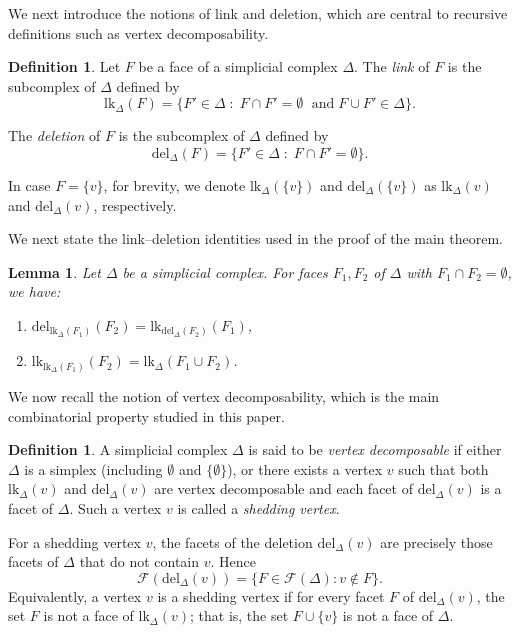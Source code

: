 \documentclass[12pt,reqno]{amsart}
\newtheorem{lemma}[theorem]{Lemma}
\theoremstyle{definition}
\newtheorem{definition}[theorem]{Definition}
\def\del{\mathrm{del}}
\def\lk{\mathrm{lk}}
\begin{document}
We next introduce the notions of link and deletion, which are central to recursive definitions such as vertex decomposability.

\begin{definition}\label{def: lk and del}
Let $F$ be a face of a simplicial complex $\Delta$. The \emph{link} of $F$ is the subcomplex of $\Delta$ defined by
\[
\lk_{\Delta}(F)=\{F' \in \Delta \; : \; F \cap F' = \emptyset \; \text{ and}\; F \cup F' \in \Delta\}.
\]

The \emph{deletion} of $F$ is the subcomplex of $\Delta$ defined by
\[
\del_{\Delta}(F)=\{F' \in \Delta \; : \; F \cap F' = \emptyset\}.
\]
\end{definition}

In case $F=\{v\}$, for brevity, we denote $\mathrm{lk}_{\Delta}(\{v\})$ and $\mathrm{del}_{\Delta}(\{v\})$ as $\mathrm{lk}_{\Delta}(v)$ and $\mathrm{del}_{\Delta}(v)$, respectively. 

We next state the link–deletion identities used in the proof of the main theorem.

\begin{lemma}\cite[Lemma 1.1]{PB80}\label{lem: identities}
Let $\Delta$ be a simplicial complex. For faces $F_1, F_2$ of $\Delta$ with $F_1 \cap F_2 = \emptyset$, we have:
\begin{enumerate}
    \item $\del_{\lk_{\Delta}(F_1)}(F_2) = \lk_{\del_{\Delta}(F_2)}(F_1)$,
    \item $\lk_{\lk_{\Delta}(F_1)}(F_2) = \lk_{\Delta}(F_1 \cup F_2)$.
\end{enumerate}
\end{lemma}

\medskip

We now recall the notion of vertex decomposability, which is the main combinatorial property studied in this paper.


\begin{definition}\label{def: VD}
A simplicial complex $\Delta$ is said to be \emph{vertex decomposable} if either $\Delta$ is a simplex (including $\emptyset$ and $\{\emptyset\}$), or there exists a vertex $v$ such that both $\lk_{\Delta}(v)$ and $\del_{\Delta}(v)$ are vertex decomposable and each facet of $\del_{\Delta}(v)$ is a facet of $\Delta$. Such a vertex $v$ is called a \emph{shedding vertex}.
\end{definition}

For a shedding vertex $v$, the facets of the deletion $\del_{\Delta}(v)$ are precisely those facets of $\Delta$ that do not contain $v$. Hence
\[
\mathcal{F}(\del_{\Delta}(v))
=
\{F \in \mathcal{F}(\Delta) : v \notin F\}.
\]
Equivalently, a vertex $v$ is a shedding vertex if for every facet $F$ of $\del_{\Delta}(v)$, the set $F$ is not a face of $\lk_{\Delta}(v)$; that is, the set $F \cup \{v\}$ is not a face of $\Delta$.
\end{document}
